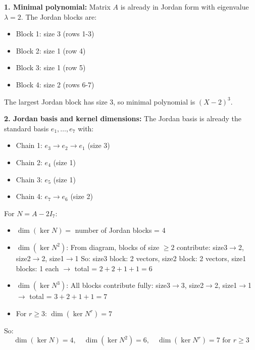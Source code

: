 \documentclass[12pt]{article}
\begin{document}
\begin{correctionbox}
\textbf{1. Minimal polynomial:}
Matrix $A$ is already in Jordan form with eigenvalue $\lambda = 2$. The Jordan blocks are:
\begin{itemize}
  \item Block 1: size 3 (rows 1-3)
  \item Block 2: size 1 (row 4)
  \item Block 3: size 1 (row 5)
  \item Block 4: size 2 (rows 6-7)
\end{itemize}


The largest Jordan block has size 3, so minimal polynomial is $(X-2)^3$.

\textbf{2. Jordan basis and kernel dimensions:}
The Jordan basis is already the standard basis $e_1,\ldots,e_7$ with:
\begin{itemize}
  \item Chain 1: $e_3 \to e_2 \to e_1$ (size 3)
  \item Chain 2: $e_4$ (size 1)
  \item Chain 3: $e_5$ (size 1)
  \item Chain 4: $e_7 \to e_6$ (size 2)
\end{itemize}

For $N = A - 2I_7$:
\begin{itemize}
  \item $\dim(\ker N) =$ number of Jordan blocks = 4
  \item $\dim(\ker N^2)$: From diagram, blocks of size $\ge 2$ contribute: size3$\to$2, size2$\to$2, size1$\to$1
  So: size3 block: 2 vectors, size2 block: 2 vectors, size1 blocks: 1 each $\to$ total = $2+2+1+1 = 6$
  \item $\dim(\ker N^3)$: All blocks contribute fully: size3$\to$3, size2$\to$2, size1$\to$1 $\to$ total = $3+2+1+1 = 7$
  \item For $r \geq 3$: $\dim(\ker N^r) = 7$
\end{itemize}

So:
\[
\dim(\ker N) = 4, \quad \dim(\ker N^2) = 6, \quad \dim(\ker N^r) = 7 \text{ for } r \geq 3
\]
\end{correctionbox}
\end{document}
